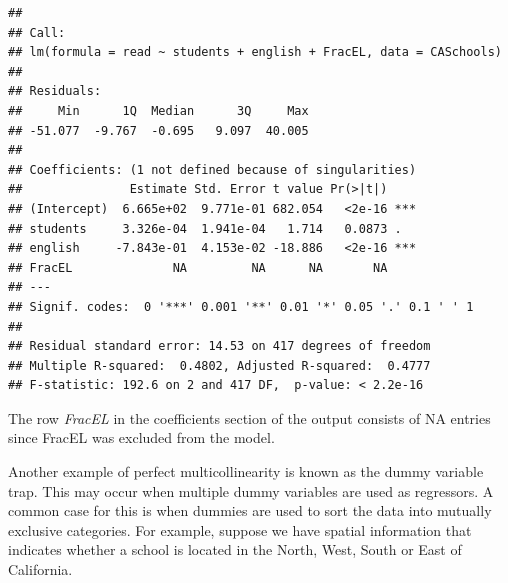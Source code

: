 \documentclass[]{book}
\newenvironment{Shaded}{\begin{snugshade}}{\end{snugshade}}
\newcommand{\CommentTok}[1]{\textcolor[rgb]{0.56,0.35,0.01}{\textit{#1}}}
\newcommand{\DataTypeTok}[1]{\textcolor[rgb]{0.13,0.29,0.53}{#1}}
\newcommand{\DecValTok}[1]{\textcolor[rgb]{0.00,0.00,0.81}{#1}}
\newcommand{\KeywordTok}[1]{\textcolor[rgb]{0.13,0.29,0.53}{\textbf{#1}}}
\newcommand{\NormalTok}[1]{#1}
\newcommand{\OperatorTok}[1]{\textcolor[rgb]{0.81,0.36,0.00}{\textbf{#1}}}
\newcommand{\StringTok}[1]{\textcolor[rgb]{0.31,0.60,0.02}{#1}}
\begin{document}
\begin{verbatim}
## 
## Call:
## lm(formula = read ~ students + english + FracEL, data = CASchools)
## 
## Residuals:
##     Min      1Q  Median      3Q     Max 
## -51.077  -9.767  -0.695   9.097  40.005 
## 
## Coefficients: (1 not defined because of singularities)
##               Estimate Std. Error t value Pr(>|t|)    
## (Intercept)  6.665e+02  9.771e-01 682.054   <2e-16 ***
## students     3.326e-04  1.941e-04   1.714   0.0873 .  
## english     -7.843e-01  4.153e-02 -18.886   <2e-16 ***
## FracEL              NA         NA      NA       NA    
## ---
## Signif. codes:  0 '***' 0.001 '**' 0.01 '*' 0.05 '.' 0.1 ' ' 1
## 
## Residual standard error: 14.53 on 417 degrees of freedom
## Multiple R-squared:  0.4802, Adjusted R-squared:  0.4777 
## F-statistic: 192.6 on 2 and 417 DF,  p-value: < 2.2e-16
\end{verbatim}

The row \emph{FracEL} in the coefficients section of the output consists of NA entries since FracEL was excluded from the model.

Another example of perfect multicollinearity is known as the dummy variable trap. This may occur when multiple dummy variables are used as regressors. A common case for this is when dummies are used to sort the data into mutually exclusive categories. For example, suppose we have spatial information that indicates whether a school is located in the North, West, South or East of California.

\begin{Shaded}
\end{Shaded}
\end{document}
